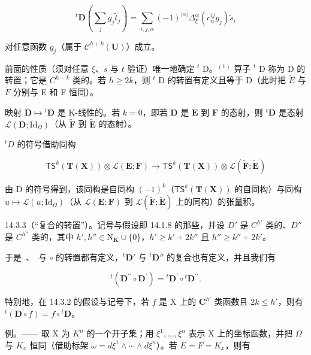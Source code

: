 \[
{ } ^ { t } \mathbf { D } \left( \sum _ { j } g _ { j } \tilde { t } _ { j } \right) = \sum _ { i , j , \alpha } ( - 1 ) ^ { | \alpha | } \Delta _ { \xi } ^ { \alpha } ( c _ { \alpha } ^ { i j } g _ { j } ) \tilde { s } _ { i }
\]

对任意函数 \(g_{j}\)（属于 \(\mathcal{C}^{h+k}(\mathbf{U})\)）成立。

前面的性质（须对任意 \(\xi\)、\(s\) 与 \(t\) 验证）唯一地确定 \(^{t}\) D。\(^{(1)}\) 算子 \(^{t}\) D 称为 D 的转置；它是 \(C^{h-k}\) 类的。若 \(h \geqslant 2k\)，则 \(^{t}\) D 的转置有定义且等于 D（此时把 \(\tilde{E}\) 与 \(\tilde{F}\) 分别与 E 和 F 恒同）。

映射 \(\mathbf{D} \mapsto {}^t\mathbf{D}\) 是 K-线性的。若 \(k = 0\)，即若 \(\mathbf{D}\) 是 \(\mathbf{E}\) 到 \(\mathbf{F}\) 的态射，则 \({}^t\mathbf{D}\) 是态射 \(\mathcal{L}(\mathbf{D}; \mathrm{Id}_{\Omega})\)（从 \(\tilde{\mathbf{F}}\) 到 \(\tilde{\mathbf{E}}\) 的态射）。

\({}^{t}D\) 的符号借助同构

\[
\mathsf {T S} ^ {k} (\mathbf {T} (\mathbf {X})) \otimes \mathscr {L} (\mathbf {E}; \mathbf {F}) \rightarrow \mathsf {T S} ^ {k} (\mathbf {T} (\mathbf {X})) \otimes \mathscr {L} (\tilde {\mathbf {F}}; \tilde {\mathbf {E}})
\]

由 D 的符号得到，该同构是自同构 \((-1)^{k}\)（\(\mathsf{T}\mathsf{S}^{k}(\mathbf{T}(\mathbf{X}))\) 的自同构）与同构 \(u\mapsto\mathcal{L}(u;\mathrm{Id}_{\Omega})\)（从 \(\mathcal{L}(\mathbf{E};\mathbf{F})\) 到 \(\mathcal{L}(\tilde{\mathbf{F}};\tilde{\mathbf{E}})\) 上的同构）的张量积。

14.3.3（“复合的转置”）。记号与假设即 14.1.8 的那些，并设 \(D'\) 是 \(C^{h'}\) 类的、\(D''\) 是 \(C^{h''}\) 类的，其中 \(h',h'' \in \mathrm{N}_{\mathbf{K}} \cup \{0\}\)，\(h' \geqslant k' + 2k''\) 且 \(h'' \geqslant k'' + 2k'\)。

于是 \,、\, 与 \(\circ\) 的转置都有定义，\(^t\mathbf{D}'\) 与 \(^t\mathbf{D}''\) 的复合也有定义，并且我们有

\[
{ } ^ { t } ( \mathbf { D } ^ { \prime \prime } \circ \mathbf { D } ^ { \prime } ) = { } ^ { t } \mathbf { D } ^ { \prime } \circ { } ^ { t } \mathbf { D } ^ { \prime \prime } .
\]

特别地，在 14.3.2 的假设与记号下，若 \(f\) 是 X 上的 \(\mathbf{C}^{h'}\) 类函数且 \(2k \leqslant h'\)，则有 \({}^t(\mathbf{D} \circ f) = f \circ {}^t\mathbf{D}\)。

例。—— 取 X 为 \(K^{n}\) 的一个开子集；用 \(\xi^{1}, \ldots, \xi^{n}\) 表示 X 上的坐标函数，并把 \(\Omega\) 与 \(K_{x}\) 恒同（借助标架 \(\omega = d\xi^{1} \wedge \cdots \wedge d\xi^{n}\)）。若 \(E = F = K_{x}\)，则有


